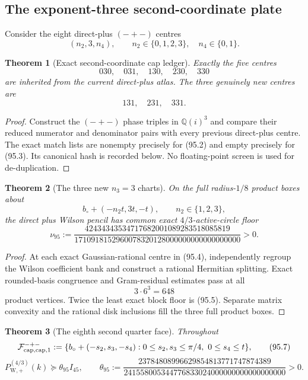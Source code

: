 \documentclass[11pt,oneside]{article}
\newtheorem{theorem}{Theorem}[section]
\theoremstyle{definition}
\theoremstyle{remark}
\begin{document}
\subsection{The exponent-three second-coordinate plate}

Consider the eight direct-plus \((-+-)\) centres
\[
 (n_2,3,n_4),\qquad n_2\in\{0,1,2,3\},\quad
 n_4\in\{0,1\}.                                     \tag{95.1}
\]

\begin{theorem}[Exact second-coordinate cap ledger]
\label{thm:newv95-intersection}
Exactly the five centres
\[
 030,\quad031,\quad130,\quad230,\quad330             \tag{95.2}
\]
are inherited from the current direct-plus atlas.  The three
genuinely new centres are
\[
 131,\quad231,\quad331.                              \tag{95.3}
\]
\end{theorem}

\begin{proof}
Construct the \((-+-)\) phase triples in \(\mathbb Q(i)^3\) and
compare their reduced numerator and denominator pairs with every
previous direct-plus centre.  The exact match lists are nonempty
precisely for (95.2) and empty precisely for (95.3).  Its canonical
hash is recorded below.  No floating-point screen is used for
de-duplication.
\end{proof}

\begin{theorem}[The three new \(n_3=3\) charts]
\label{thm:newv95-three-charts}
On the full radius-\(1/8\) product boxes about
\[
 b_\circ+(-n_2t,3t,-t),\qquad n_2\in\{1,2,3\},       \tag{95.4}
\]
the direct plus Wilson pencil has common exact
\(4/3\)-active-circle floor
\[
\nu_{95}:=
\frac{42434343534717682001089283518085819}
     {1710918152960078320128000000000000000000}>0.   \tag{95.5}
\]
\end{theorem}

\begin{proof}
At each exact Gaussian-rational centre in (95.4), independently
regroup the Wilson coefficient bank and construct a rational
Hermitian splitting.  Exact rounded-basis congruence and
Gram-residual estimates pass at all
\[
 3\cdot6^3=648                                      \tag{95.6}
\]
product vertices.  Twice the least exact block floor is (95.5).
Separate matrix convexity and the rational disk inclusions fill the
three full product boxes.
\end{proof}

\begin{theorem}[The eighth second quarter face]
\label{thm:newv95-second-quarter-face}
Throughout
\[
 {\cal F}^{-+-}_{\mathrm{cap},\mathrm{cap},1}:=
 \{b_\circ+(-s_2,s_3,-s_4):
 0\leq s_2,s_3\leq\pi/4,\ 0\leq s_4\leq t\},        \tag{95.7}
\]
\[
 P_{\mathrm W,+}^{(4/3)}(k)
 \succeq\theta_{95}I_{45},\qquad
 \theta_{95}:=
 \frac{23784808996629854813771747874389}
 {241558005344776833024000000000000000000}>0.         \tag{95.8}
\]
\end{theorem}
\end{document}
